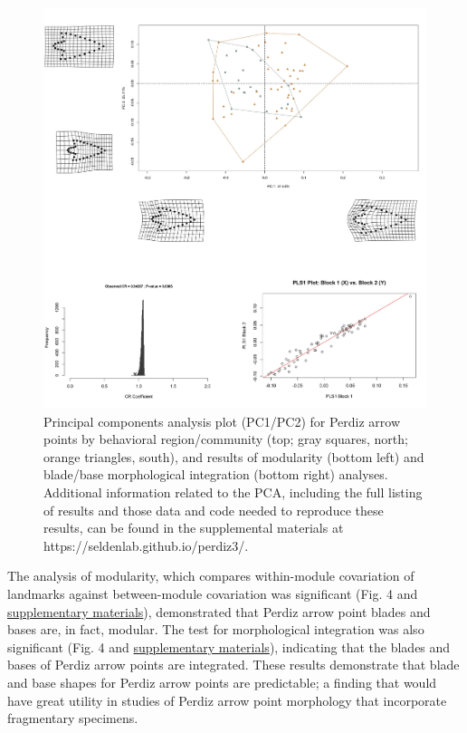 \documentclass[smallextended]{svjour3}       %
\begin{document}
\begin{figure}
\includegraphics[width=1\linewidth]{ms-figs/figure4} \caption{Principal components analysis plot (PC1/PC2) for Perdiz arrow points by behavioral region/community (top; gray squares, north; orange triangles, south), and results of modularity (bottom left) and blade/base morphological integration (bottom right) analyses. Additional information related to the PCA, including the full listing of results and those data and code needed to reproduce these results, can be found in the supplemental materials at https://seldenlab.github.io/perdiz3/.}\label{fig:fig4}
\end{figure}

The analysis of modularity, which compares within-module covariation of
landmarks against between-module covariation was significant (Fig. 4 and
\href{https://seldenlab.github.io/perdiz3/}{supplementary materials}),
demonstrated that Perdiz arrow point blades and bases are, in fact,
modular. The test for morphological integration was also significant
(Fig. 4 and \href{https://seldenlab.github.io/perdiz3/}{supplementary
materials}), indicating that the blades and bases of Perdiz arrow points
are integrated. These results demonstrate that blade and base shapes for
Perdiz arrow points are predictable; a finding that would have great
utility in studies of Perdiz arrow point morphology that incorporate
fragmentary specimens.
\end{document}

